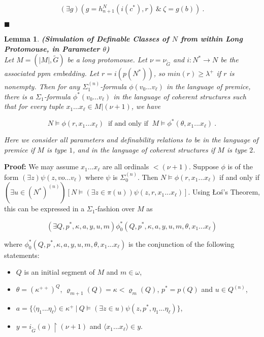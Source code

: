 \documentclass[12pt]{article}
\newtheorem{lem}[thm]{Lemma}
\begin{document}
\[
(\exists g ) ( g = h_{n+1}^N (i( c^* ) , r ) \ \& \ \zeta = g (b)) \ .
\]

$\blacksquare$\\



\begin{lem} \label{long translation2}
\textbf{(Simulation of Definable Classes of $N$ from within Long Protomouse, in Parameter $\theta$)}\\

Let $M = (|M| , \tilde{G})$ be a long protomouse.  Let $ \nu = \nu_{\tilde{G}}$ and $i: N^* \longrightarrow  N$ be the associated ppm embedding.  Let $r =  i (p (N^* ))$, so $min(r) \geq \lambda^+$ if $r$ is nonempty.  Then  for any $\Sigma_1^{(n)}$-formula $\phi ( v_0 ... v_\ell )$ in the language of premice, there is a $\Sigma_1$-formula $\phi^* ( v_0 ... v_\ell )$ in the language of coherent structures such that for every tuple $x_1 ... x_\ell \in M | (\nu + 1 )$, we have

\[
N \models \phi ( r , x_1 ... x_\ell ) \ \text{ if and only if } \ M \models \phi^* ( \theta , x_1 ... x_\ell ) \ .
\]

Here we consider all parameters and definability relations to be in the language of premice if $M$ is type $1$, and in the language of coherent structures if $M$ is type $2$.

\end{lem}


\indent \indent \textbf{Proof:}  We may assume $x_1 ... x_\ell$ are all ordinals $< (\nu + 1)$.  Suppose $\phi$ is of the form $(\exists z) \psi (z , vo ... v_\ell )$ where $\psi$ is $\Sigma_0^{(n)}$.  Then $N \models \phi (r, x_1 ... x_\ell )$ if and only if $(\exists u \in (N^*)^{(n)} ) [ N \models ( \exists z \in \pi (u) ) \psi ( z , r , x_1 ... x_\ell ) ]$.  Using {\L}o{\'s}'s Theorem, this can be expressed in a $\Sigma_1$-fashion over $M$ as

\[
( \exists Q , p^* , \kappa , a , y , u , m) \phi_0^* (Q , p^* , \kappa , a , y , u , m , \theta , x_1 ... x_\ell )
\]

where $\phi_0^* (Q , p^* , \kappa , a , y , u , m , \theta , x_1 ... x_\ell )$ is the conjunction of the following statements:\\

\begin{itemize}
\item{ $Q$ is an initial segment of $M$ and $m \in \omega$,}
\item{ $\theta = (\kappa^{++})^Q$, $\varrho_{m+1} (Q) = \kappa < \varrho_m (Q)$, $p^* = p (Q)$ and $u \in Q^{(n)}$,}
\item{ $a = \{ \langle \eta_1 ... \eta_\ell \rangle \in \kappa^+ \ | \ Q \models (\exists z \in u ) \psi (z , p^* , \eta_1 ... \eta_\ell ) \}$,}
\item{ $y = i_{\tilde{G}}(a) \restriction (\nu +1)$ and $\langle x_1 ... x_\ell \rangle \in y$.}
\end{itemize}
\end{document}
